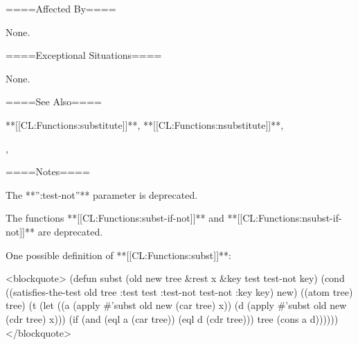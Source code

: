 ====Affected By====

None.

====Exceptional Situations====

None.

====See Also====

**[[CL:Functions:substitute]]**, **[[CL:Functions:nsubstitute]]**,

{\secref\ConstantModification},

{\secref\TraversalRules}

====Notes====

The **'':test-not''** parameter is deprecated.

The functions **[[CL:Functions:subst-if-not]]** and **[[CL:Functions:nsubst-if-not]]** are deprecated.

One possible definition of **[[CL:Functions:subst]]**:

<blockquote> (defun subst (old new tree &rest x &key test test-not key) (cond ((satisfies-the-test old tree :test test :test-not test-not :key key) new) ((atom tree) tree) (t (let ((a (apply #'subst old new (car tree) x)) (d (apply #'subst old new (cdr tree) x))) (if (and (eql a (car tree)) (eql d (cdr tree))) tree (cons a d)))))) </blockquote>

     
